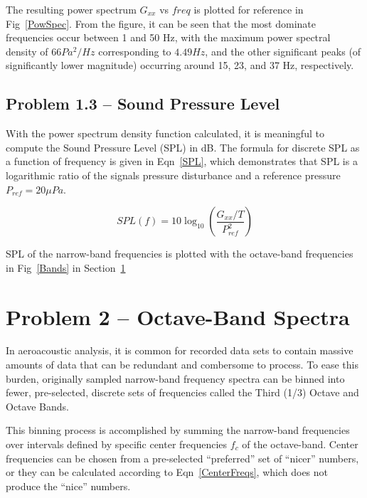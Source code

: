 \documentclass[twocolumn,10pt]{asme2ej}
\begin{document}
The resulting power spectrum $G_{xx}$ vs $freq$ is plotted for reference in Fig~\ref{PowSpec}.  From the figure, it can be seen that the most dominate frequencies occur between 1 and 50 Hz, with the maximum power spectral density of $66 Pa^2\text{/}Hz$ corresponding to $4.49Hz$, and the other significant peaks (of significantly lower magnitude) occurring around 15, 23, and 37 Hz, respectively.

\subsection{Problem 1.3 -- Sound Pressure Level}

With the power spectrum density function calculated, it is meaningful to compute the Sound Pressure Level (SPL) in dB.  The formula for discrete SPL as a function of frequency is given in Eqn~\ref{SPL}, which demonstrates that SPL is a logarithmic ratio of the signal\textquotesingle s pressure disturbance and a reference pressure $P_{ref}=20\mu Pa$.

\begin{equation} \label{SPL}
SPL(f) = 10\log_{10}\left( \dfrac{G_{xx} / T}{P_{ref}^2} \right)
\end{equation}

\noindent SPL of the narrow-band frequencies is plotted with the octave-band frequencies in Fig~\ref{Bands} in Section~\ref{sect_oct}


\section{Problem 2 -- Octave-Band Spectra} \label{sect_oct}

In aeroacoustic analysis, it is common for recorded data sets to contain massive amounts of data that can be redundant and combersome to process.  To ease this burden, originally sampled narrow-band frequency spectra can be binned into fewer, pre-selected, discrete sets of frequencies called the Third (1/3) Octave and Octave Bands.

This binning process is accomplished by summing the narrow-band frequencies over intervals defined by specific center frequencies $f_c$ of the octave-band.  Center frequencies can be chosen from a pre-selected ``preferred'' set of ``nicer'' numbers, or they can be calculated according to Eqn~\ref{CenterFreqs}, which does not produce the ``nice'' numbers.
\end{document}
